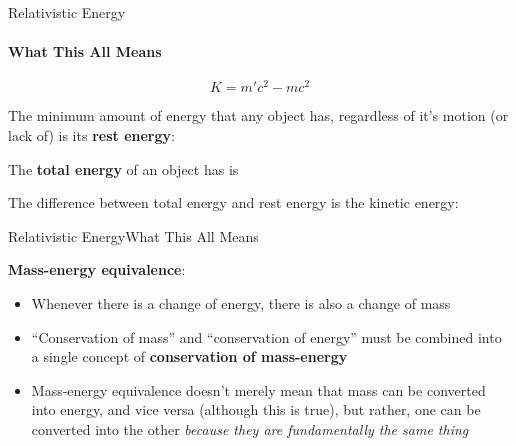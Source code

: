 \documentclass[12pt,compress,aspectratio=169]{beamer}
\begin{document}
\begin{frame}{Relativistic Energy}
  \framesubtitle{What This All Means}
  {\Large
    \begin{displaymath}
      \boxed{K=m'c^2-mc^2}
    \end{displaymath}
  }

  The minimum amount of energy that any object has, regardless of it's motion
  (or lack of) is its \textbf{rest energy}:
  

  \vspace{-.2in}The \textbf{total energy} of an object has is
    

  \vspace{-.2in}The difference between total energy and rest energy is the
  kinetic energy:

\end{frame}


\begin{frame}{Relativistic Energy}{What This All Means}
  

  \textbf{Mass-energy equivalence}:
  \begin{itemize}
  \item Whenever there is a change of energy, there is also a change of mass
  \item ``Conservation of mass'' and ``conservation of energy'' must be
    combined into a single concept of \textbf{conservation of mass-energy}
  \item Mass-energy equivalence doesn't merely mean that mass can be converted
    into energy, and vice versa (although this is true), but rather, one can be
    converted into the other
    \emph{because they are fundamentally the same thing}
  \end{itemize}
\end{frame}



\end{document}
